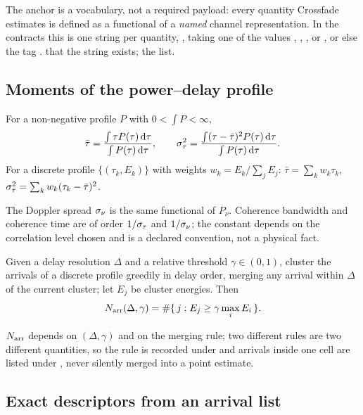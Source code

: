 The anchor is a vocabulary, not a required payload: every quantity Crossfade estimates is defined as a functional of a \emph{named} channel representation. In the contracts this is one string per quantity, , taking one of the values , , ,  or , or else the tag . \tagG{} that the string exists; \tagP{} the list.

\subsection{Moments of the power--delay profile}

\begin{definition}
For a non-negative profile $P$ with $0<\int P<\infty$,
\begin{equation}
  \bar\tau = \frac{\int \tau P(\tau)\,\mathrm{d}\tau}{\int P(\tau)\,\mathrm{d}\tau},\qquad
  \sigma_{\tau}^2 = \frac{\int (\tau-\bar\tau)^2 P(\tau)\,\mathrm{d}\tau}{\int P(\tau)\,\mathrm{d}\tau}.
  \label{eq:moments}
\end{equation}
For a discrete profile $\{(\tau_k, E_k)\}$ with weights $w_k=E_k/\sum_j E_j$: $\bar\tau=\sum_k w_k\tau_k$, $\sigma_{\tau}^2=\sum_k w_k(\tau_k-\bar\tau)^2$.
\end{definition}
The Doppler spread $\sigma_{\nu}$ is the same functional of $P_\nu$. Coherence bandwidth and coherence time are of order $1/\sigma_{\tau}$ and $1/\sigma_{\nu}$; the constant depends on the correlation level chosen and is a declared convention, not a physical fact.

\begin{definition} \tagP{}
Given a delay resolution $\Delta$ and a relative threshold $\gamma\in(0,1)$, cluster the arrivals of a discrete profile greedily in delay order, merging any arrival within $\Delta$ of the current cluster; let $E_j$ be cluster energies. Then
\begin{equation}
  N_{\mathrm{arr}}(\Delta,\gamma) = \#\{\,j : E_j \ge \gamma \max_i E_i\,\}.
  \label{eq:narr}
\end{equation}
\end{definition}
$N_{\mathrm{arr}}$ depends on $(\Delta,\gamma)$ and on the merging rule; two different rules are two different quantities, so the rule is recorded under  and arrivals inside one cell are listed under , never silently merged into a point estimate.

\subsection{Exact descriptors from an arrival list}

